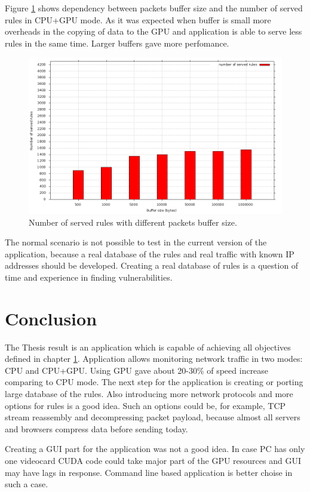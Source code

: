 \documentclass[thesis=M,english]{FITthesis}[2011/07/15]
\begin{document}
Figure \ref{fig:graph2} shows dependency between packets buffer size and the number of served rules in CPU+GPU mode. As it was expected when buffer is small more overheads in the copying of data to the GPU and application is able to serve less rules in the same time. Larger buffers gave more perfomance.

\begin{figure}[h]
\centering
\includegraphics[scale=0.3]{images/graph2.png}
\caption{Number of served rules with different packets buffer size.}
\label{fig:graph2}
\end{figure}

The normal scenario is not possible to test in the current version of the application, because a real database of the rules and real traffic with known IP addresses should be developed. Creating a real database of rules is a question of time and experience in finding vulnerabilities.

\chapter{Conclusion}
The Thesis result is an application which is capable of achieving all objectives defined in chapter \ref{}. Application allows monitoring network traffic in two modes: CPU and CPU+GPU. Using GPU gave about 20-30\% of speed increase comparing to CPU mode. The next step for the application is creating or porting large database of the rules. Also introducing more network protocols and more options for rules is a good idea. Such an options could be, for example, TCP stream reassembly and decompressing packet payload, because almost all servers and browsers compress data before sending today.

Creating a GUI part for the application was not a good idea. In case PC has only one videocard CUDA code could take major part of the GPU resources and GUI may have lags in response. Command line based application is better choise in such a case.
\end{document}

